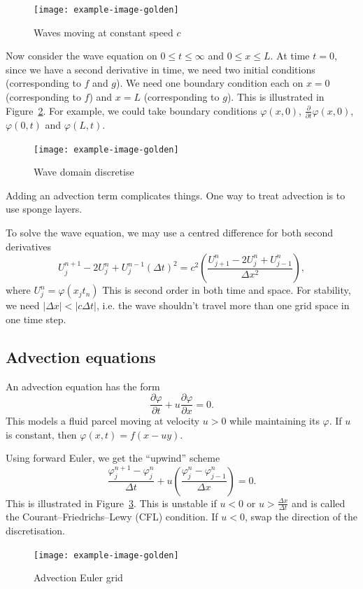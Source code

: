 \documentclass[11pt, a4paper]{article}
\renewcommand{\phi}{\varphi}
\theoremstyle{break}
\newcommand*{\size}[1]{|#1|}%
\newcommand*{\Paren}[1]{\left(#1\right)}%
\newcommand{\dt}{\Delta t}
\newcommand{\dx}{\Delta x}
\newcommand{\der}[2]{\frac{\partial #1}{\partial #2}}
\begin{document}
\begin{figure}\centering
	\texttt{[image: example-image-golden]}
	\caption{Waves moving at constant speed $c$}\label{fig:waveMove}
\end{figure}


	Now consider the wave equation on $0\leq t\leq \infty$ and $0\leq x\leq L$. At time $t=0$, since we have a second derivative in time, we need two initial conditions (corresponding to $f$ and $g$). We need one boundary condition each on $x=0$ (corresponding to $f$) and $x=L$ (corresponding to $g$). This is illustrated in Figure~\ref{fig:waveDomain}. For example, we could take boundary conditions $\phi(x,0)$, $\der{}t\phi(x,0)$, $\phi(0,t)$ and $\phi(L,t)$.
	
	\begin{figure}\centering
		\texttt{[image: example-image-golden]}
		\caption{Wave domain discretise}\label{fig:waveDomain}
	\end{figure}
	
	 Adding an advection term complicates things. One way to treat advection is to use sponge layers.
	 
	 To solve the wave equation, we may use a centred difference for both second derivatives \[U_j^{n+1}-2U_j^n+U_j^{n-1}{(\dt)^2}=c^2\Paren{\frac{U^n_{j+1}-2U_j^n+U^n_{j-1}}{\dx^2}},\] where $U_j^n = \phi(x_jt_n)$ This is second order in both time and space. For stability, we need $\size{\dx}<\size{c\dt}$, i.e. the wave shouldn't travel more than one grid space in one time step.
	

\subsection{Advection equations}
An advection equation has the form \[\der\phi t+u\der\phi x=0.\] This models a fluid parcel moving at velocity $u>0$ while maintaining its $\phi$. If $u$ is constant, then $\phi(x,t)=f(x-uy)$.

Using forward Euler, we get the ``upwind'' scheme \[\frac{\phi_j^{n+1}-\phi_j^n}{\dt}+u\Paren{\frac{\phi^n_j-\phi^n_{j-1}}{\dx}}=0.\] This is illustrated in Figure~\ref{fig:advectionEuler}. This is unstable if $u<0$ or $u>\frac{\dx}{\dt}$ and is called the Courant–Friedrichs–Lewy (CFL) condition. If $u<0$, swap the direction of the discretisation.

	\begin{figure}\centering
	\texttt{[image: example-image-golden]}
	\caption{Advection Euler grid}\label{fig:advectionEuler}
	\end{figure}
	
\end{document}
